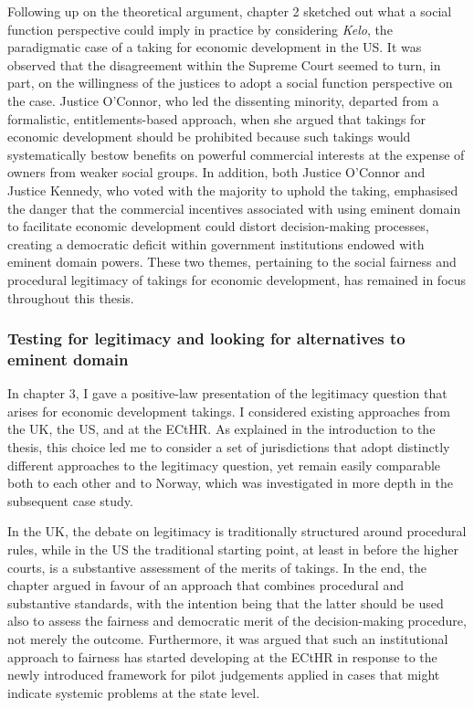 Following up on the theoretical argument, chapter 2 sketched out what a social function perspective could imply in practice by considering {\it Kelo}, the paradigmatic case of a taking for economic development in the US. It was observed that the disagreement within the Supreme Court seemed to turn, in part, on the willingness of the justices to adopt a social function perspective on the case. Justice O'Connor, who led the dissenting minority, departed from a formalistic, entitlements-based approach, when she argued that takings for economic development should be prohibited because such takings would systematically bestow benefits on powerful commercial interests at the expense of owners from weaker social groups. In addition, both Justice O'Connor and Justice Kennedy, who voted with the majority to uphold the taking, emphasised the danger that the commercial incentives associated with using eminent domain to facilitate economic development could distort decision-making processes, creating a democratic deficit within government institutions endowed with eminent domain powers. These two themes, pertaining to the social fairness and procedural legitimacy of takings for economic development, has remained in focus throughout this thesis.

\subsubsection*{Testing for legitimacy and looking for alternatives to eminent domain}

In chapter 3, I gave a positive-law presentation of the legitimacy question that arises for economic development takings.
I considered existing approaches from the UK, the US, and at the ECtHR. As explained in the introduction to the thesis, this choice led me to consider a set of jurisdictions that adopt distinctly different approaches to the legitimacy question, yet remain easily comparable both to each other and to Norway, which was investigated in more depth in the subsequent case study. 

In the UK, the debate on legitimacy is traditionally structured around procedural rules, while in the US the traditional starting point, at least in before the higher courts, is a substantive assessment of the merits of takings. In the end, the chapter argued in favour of an approach that combines procedural and substantive standards, with the intention being that the latter should be used also to assess the fairness and democratic merit of the decision-making procedure, not merely the outcome. Furthermore, it was argued that such an institutional approach to fairness has started developing at the ECtHR in response to the newly introduced framework for pilot judgements applied in cases that might indicate systemic problems at the state level.

